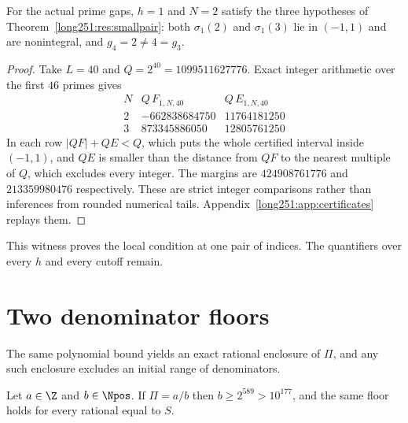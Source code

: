 \documentclass[11pt]{article}
\begin{document}
\begin{proposition}\label{long251:res:finite-smallpair}
For the actual prime gaps, $h=1$ and $N=2$ satisfy the three hypotheses of
Theorem~\ref{long251:res:smallpair}: both $\sigma_1(2)$ and $\sigma_1(3)$ lie in
$(-1,1)$ and are nonintegral, and $g_4=2\ne4=g_3$.
\end{proposition}

\begin{proof}
Take $L=40$ and $Q=2^{40}=1099511627776$.  Exact integer arithmetic over the
first $46$ primes gives
\[
\begin{array}{c|r|r}
 N&Q\,F_{1,N,40}&Q\,E_{1,N,40}\\\hline
 2&-662838684750&11764181250\\
 3& 873345886050&12805761250
\end{array}
\]
In each row $|QF|+QE<Q$, which puts the whole certified interval inside
$(-1,1)$, and $QE$ is smaller than the distance from $QF$ to the nearest
multiple of $Q$, which excludes every integer.  The margins are $424908761776$
and $213359980476$ respectively.  These are strict integer comparisons rather
than inferences from rounded numerical tails.
Appendix~\ref{long251:app:certificates} replays them.
\end{proof}

This witness proves the local condition at one pair of indices.  The
quantifiers over every $h$ and every cutoff remain.

\section{Two denominator floors}\label{long251:sec:denominator-floor}

The same polynomial bound yields an exact rational enclosure of $\Pi$, and any
such enclosure excludes an initial range of denominators.

\begin{theorem}\label{long251:res:denominatorfloor}
Let $a\in\Z$ and $b\in\Npos$.  If $\Pi=a/b$ then $b\ge2^{589}>10^{177}$, and
the same floor holds for every rational equal to $S$.
\end{theorem}
\end{document}
